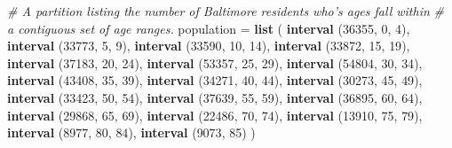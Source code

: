 \documentclass[]{article}
\newenvironment{Shaded}{}{}
\newcommand{\CommentTok}[1]{\textcolor[rgb]{0.38,0.63,0.69}{\textit{#1}}}
\newcommand{\DecValTok}[1]{\textcolor[rgb]{0.25,0.63,0.44}{#1}}
\newcommand{\KeywordTok}[1]{\textcolor[rgb]{0.00,0.44,0.13}{\textbf{#1}}}
\newcommand{\NormalTok}[1]{#1}
\newcommand{\StringTok}[1]{\textcolor[rgb]{0.25,0.44,0.63}{#1}}
\begin{document}
\begin{Shaded}
\begin{Highlighting}[]
\CommentTok{# A partition listing the number of Baltimore residents who's ages fall within}
\CommentTok{# a contiguous set of age ranges.}
\NormalTok{population =}\StringTok{ }\KeywordTok{list}\NormalTok{ (}
  \KeywordTok{interval}\NormalTok{ (}\DecValTok{36355}\NormalTok{, }\DecValTok{0}\NormalTok{, }\DecValTok{4}\NormalTok{),}
  \KeywordTok{interval}\NormalTok{ (}\DecValTok{33773}\NormalTok{, }\DecValTok{5}\NormalTok{, }\DecValTok{9}\NormalTok{),}
  \KeywordTok{interval}\NormalTok{ (}\DecValTok{33590}\NormalTok{, }\DecValTok{10}\NormalTok{, }\DecValTok{14}\NormalTok{),}
  \KeywordTok{interval}\NormalTok{ (}\DecValTok{33872}\NormalTok{, }\DecValTok{15}\NormalTok{, }\DecValTok{19}\NormalTok{),}
  \KeywordTok{interval}\NormalTok{ (}\DecValTok{37183}\NormalTok{, }\DecValTok{20}\NormalTok{, }\DecValTok{24}\NormalTok{),}
  \KeywordTok{interval}\NormalTok{ (}\DecValTok{53357}\NormalTok{, }\DecValTok{25}\NormalTok{, }\DecValTok{29}\NormalTok{),}
  \KeywordTok{interval}\NormalTok{ (}\DecValTok{54804}\NormalTok{, }\DecValTok{30}\NormalTok{, }\DecValTok{34}\NormalTok{),}
  \KeywordTok{interval}\NormalTok{ (}\DecValTok{43408}\NormalTok{, }\DecValTok{35}\NormalTok{, }\DecValTok{39}\NormalTok{),}
  \KeywordTok{interval}\NormalTok{ (}\DecValTok{34271}\NormalTok{, }\DecValTok{40}\NormalTok{, }\DecValTok{44}\NormalTok{),}
  \KeywordTok{interval}\NormalTok{ (}\DecValTok{30273}\NormalTok{, }\DecValTok{45}\NormalTok{, }\DecValTok{49}\NormalTok{),}
  \KeywordTok{interval}\NormalTok{ (}\DecValTok{33423}\NormalTok{, }\DecValTok{50}\NormalTok{, }\DecValTok{54}\NormalTok{),}
  \KeywordTok{interval}\NormalTok{ (}\DecValTok{37639}\NormalTok{, }\DecValTok{55}\NormalTok{, }\DecValTok{59}\NormalTok{),}
  \KeywordTok{interval}\NormalTok{ (}\DecValTok{36895}\NormalTok{, }\DecValTok{60}\NormalTok{, }\DecValTok{64}\NormalTok{),}
  \KeywordTok{interval}\NormalTok{ (}\DecValTok{29868}\NormalTok{, }\DecValTok{65}\NormalTok{, }\DecValTok{69}\NormalTok{),}
  \KeywordTok{interval}\NormalTok{ (}\DecValTok{22486}\NormalTok{, }\DecValTok{70}\NormalTok{, }\DecValTok{74}\NormalTok{),}
  \KeywordTok{interval}\NormalTok{ (}\DecValTok{13910}\NormalTok{, }\DecValTok{75}\NormalTok{, }\DecValTok{79}\NormalTok{),}
  \KeywordTok{interval}\NormalTok{ (}\DecValTok{8977}\NormalTok{, }\DecValTok{80}\NormalTok{, }\DecValTok{84}\NormalTok{),}
  \KeywordTok{interval}\NormalTok{ (}\DecValTok{9073}\NormalTok{, }\DecValTok{85}\NormalTok{)}
\NormalTok{)}


\end{Highlighting}
\end{Shaded}
\end{document}
